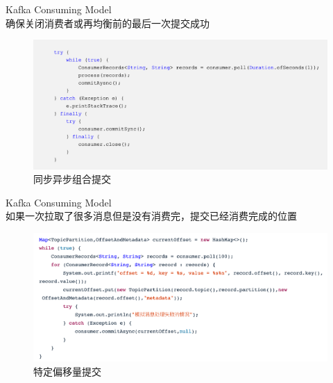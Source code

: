 \begin{frame}[plain,t]{Kafka Consuming Model} %
	 \\  \vspace{2ex}
	确保关闭消费者或再均衡前的最后一次提交成功
	\begin{figure}
		\centering
		\includegraphics[width=0.9\linewidth]{image/0310}
		\caption{同步异步组合提交}
		\label{fig:0310}
	\end{figure}
	
\end{frame}
\begin{frame}[plain,t]{Kafka Consuming Model} %
	 \\  \vspace{2ex}
	如果一次拉取了很多消息但是没有消费完，提交已经消费完成的位置
	\begin{figure}
		\centering
		\includegraphics[width=0.9\linewidth]{image/0311}
		\caption{特定偏移量提交}
		\label{fig:0311}
	\end{figure}
	
\end{frame}


